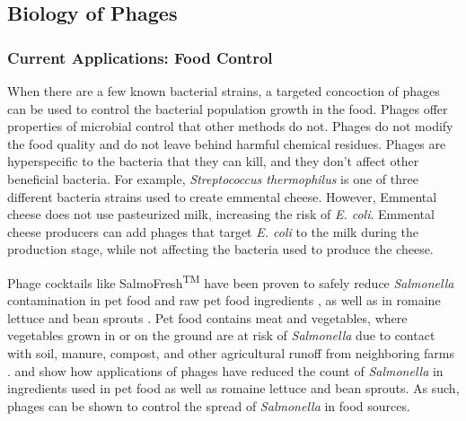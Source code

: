 \subsection{Biology of Phages}
\subsubsection{Current Applications: Food Control}

When there are a few known bacterial strains, a targeted concoction of phages can be used to control the bacterial population growth in the food. Phages offer properties of microbial control that other methods do not. Phages do not modify the food quality and do not leave behind harmful chemical residues. Phages are hyperspecific to the bacteria that they can kill, and they don't affect other beneficial bacteria. For example, \textit{Streptococcus thermophilus} is one of three different bacteria strains used to create emmental cheese. However, Emmental cheese does not use pasteurized milk, increasing the risk of \textit{E. coli}. Emmental cheese producers can add phages that target \textit{E. coli} to the milk during the production stage, while not affecting the bacteria used to produce the cheese. \newline 


Phage cocktails like SalmoFresh\textsuperscript{TM} have been proven to safely reduce \textit{Salmonella} contamination in pet food and raw pet food ingredients \cite{sofferBacteriophagesSafelyReduce2016}, as well as in romaine lettuce and bean sprouts \cite{zhangSalmoFreshEffectivenessControlling2019}. Pet food contains meat and vegetables, where vegetables grown in or on the ground are at risk of \textit{Salmonella} due to contact with soil, manure, compost, and other agricultural runoff from neighboring farms \cite{kowalskaFreshVegetablesFruit2023}.  \cite{sofferBacteriophagesSafelyReduce2016} and  \cite{zhangSalmoFreshEffectivenessControlling2019} show how applications of phages have reduced the count of \textit{Salmonella} in ingredients used in pet food as well as romaine lettuce and bean sprouts. As such, phages can be shown to control the spread of \textit{Salmonella} in food sources. 

